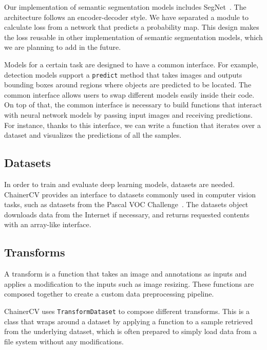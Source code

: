 \documentclass[sigconf]{acmart}
\begin{document}
Our implementation of semantic segmentation models includes SegNet~\cite{badrinarayanan2015segnet}.
The architecture follows an encoder-decoder style.
We have separated a module to calculate loss from a network that predicts a probability map.
This design makes the loss reusable in other implementation of semantic segmentation models, which we are planning to add in the future.

Models for a certain task are designed to have a common interface.
For example, detection models support a {\tt predict} method that takes images and outputs bounding boxes around regions where objects are predicted to be located.
The common interface allows users to swap different models easily inside their code.
On top of that, the common interface is necessary to build functions that interact with neural network models by passing input images and receiving predictions.
For instance, thanks to this interface, we can write a function that iterates over a dataset and visualizes the predictions of all the samples.









\subsection{Datasets}
In order to train and evaluate deep learning models, datasets are needed.
ChainerCV provides an interface to datasets commonly used in computer vision tasks, such as datasets from the Pascal VOC Challenge~\cite{Everingham10}.
The datasets object downloads data from the Internet if necessary, and returns requested contents with an array-like interface.

\subsection{Transforms}
A transform is a function that takes an image and annotations as inputs and applies a modification to the inputs such as image resizing.
These functions are composed together to create a custom data preprocessing pipeline.

ChainerCV uses {\tt TransformDataset} to compose different transforms.
This is a class that wraps around a dataset by applying a function to a sample retrieved from the underlying dataset, which is often prepared to simply load data from a file system without any modifications.
\end{document}
